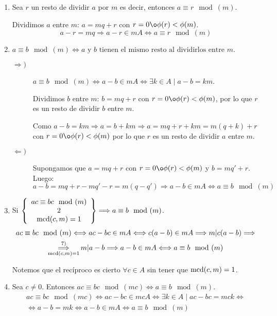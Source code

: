 \begin{enumerate}
    \item Sea $r$ un resto de dividir $a$ por $m$ es decir, entonces $a\equiv r\mod (m)$.

    Dividimos $a$ entre $m$: $a=mq+r$ con $r= 0 \o \phi(r) < \phi(m)$.
    $$a-r = mq \Longrightarrow a-r \in mA \Longleftrightarrow a\equiv r\mod(m)$$

    \item $a\equiv b\mod(m) \Longleftrightarrow a \mbox{ y } b \mbox{ tienen el mismo resto al dividirlos entre } m.$
    \begin{description}
        \item[$\Longrightarrow)$] $a\equiv b\mod(m) \Longleftrightarrow a-b \in mA \Longleftrightarrow \exists k \in A \mid a-b =km$.
        
            Dividimos $b$ entre $m$: $b = mq + r$ con $r=0 \o \phi(r) < \phi(m)$, por lo que $r$ es un resto de dividir $b$ entre $m$.
            
            Como $a-b=km \Longrightarrow a=b+km \Longrightarrow a=mq+r+km = m(q+k)+r$ con $r=0 \o \phi(r)<\phi(m)$ por lo que $r$ es un resto de dividir $a$ entre $m$.
            
        \item[$\Longleftarrow)$]
            Supongamos que $a=mq+r$ con $r=0 \o \phi(r)<\phi(m)$ y $b=mq' +r$. Luego:
            $$a-b = mq +r -mq'-r = m(q-q') \Longrightarrow a-b \in mA \Longleftrightarrow a\equiv b\mod(m)$$
    \end{description}

    \item \label{conj_prop7}Si $\left\{ \begin{array}{c}
        ac \equiv bc\mod(m) \\ 2 \\
        \operatorname{mcd}(c,m)=1
    \end{array} \right\} \Longrightarrow a\equiv b\mod(m)$.
    \begin{multline*}
        ac \equiv bc\mod(m) \Longleftrightarrow ac - bc \in mA \Longleftrightarrow c(a-b) \in mA \Longrightarrow m|c(a-b) \Longrightarrow \\
        \mathop{\Longrightarrow}^{7)}_{\operatorname{mcd}(c,m)=1} m|a-b \Longrightarrow a-b \in mA \Longleftrightarrow a\equiv b\mod(m)
    \end{multline*}

    Notemos que el recíproco es cierto $\forall c \in A$ sin tener que $\operatorname{mcd}(c,m)=1$.

    \item \label{conj_prop8} Sea $c\neq 0$. Entonces $ac\equiv bc\mod(mc) \Longleftrightarrow a\equiv b\mod(m)$.
    \begin{multline*}
        ac\equiv bc\mod(mc) \Longleftrightarrow ac-bc \in mcA \Longleftrightarrow \exists k \in A \mid ac-bc = mck \Longleftrightarrow \\
        \Longleftrightarrow a-b = mk \Longleftrightarrow a-b \in mA \Longleftrightarrow a\equiv b\mod(m)
    \end{multline*}
\end{enumerate}

